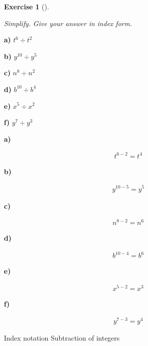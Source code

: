 \documentclass[
  letterpaper,
  DIV=11,
  numbers=noendperiod]{scrreprt}
\theoremstyle{definition}
\newtheorem{exercise}{Exercise}[chapter]
\theoremstyle{remark}
\begin{document}
\begin{exercise}[]\protect\hypertarget{exr-u2-5}{}\label{exr-u2-5}

\emph{Simplify. Give your answer in index form.}

\textbf{a)} \(\displaystyle t^{6} \div t^{2}\)

\textbf{b)} \(\displaystyle y^{10} \div y^{5}\)

\textbf{c)} \(\displaystyle n^{8} \div n^{2}\)

\textbf{d)} \(\displaystyle b^{10} \div b^{4}\)

\textbf{e)} \(\displaystyle x^{5} \div x^{2}\)

\textbf{f)} \(\displaystyle y^{7} \div y^{3}\)

\begin{tcolorbox}[enhanced jigsaw, opacitybacktitle=0.6, coltitle=black, arc=.35mm, colframe=quarto-callout-tip-color-frame, colback=white, bottomrule=.15mm, left=2mm, colbacktitle=quarto-callout-tip-color!10!white, titlerule=0mm, opacityback=0, title=\textcolor{quarto-callout-tip-color}{\faLightbulb}\hspace{0.5em}{🔍 View Solutions}, leftrule=.75mm, breakable, rightrule=.15mm, bottomtitle=1mm, toptitle=1mm, toprule=.15mm]

\textbf{a)}

\[
\begin{aligned}
t^{6-2} = t^{4}
\end{aligned}
\]

\textbf{b)}

\[
\begin{aligned}
y^{10-5} = y^{5}
\end{aligned}
\]

\textbf{c)}

\[
\begin{aligned}
n^{8-2} = n^{6}
\end{aligned}
\]

\textbf{d)}

\[
\begin{aligned}
b^{10-4} = b^{6}
\end{aligned}
\]

\textbf{e)}

\[
\begin{aligned}
x^{5-2} = x^{3}
\end{aligned}
\]

\textbf{f)}

\[
\begin{aligned}
y^{7-3} = y^{4}
\end{aligned}
\]

\end{tcolorbox}

{Index notation} {Subtraction of integers}

\end{exercise}
\end{document}
